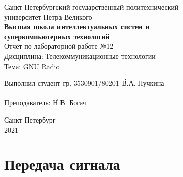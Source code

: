 \documentclass[a4paper, 14pt]{extarticle}
\begin{document}
    \begin{center}
        \begin{center}
            \hfill \break
            \normalsize{Санкт-Петербургский государственный политехнический}\\
            \normalsize{университет Петра Великого}\\
            \hfill \break
            \normalsize{\textbf{Высшая школа интеллектуальных систем и}}\\
            \normalsize{\textbf{суперкомпьютерных технологий}}\\
            \hfill \break
            \hfill \break
            \hfill \break
            \hfill \break
            \hfill \break
            \normalsize{Отчёт по лабораторной работе №12}\\
            \normalsize{Дисциплина: Телекоммуникационные технологии}\\
            \normalsize{Тема: GNU Radio}\\
        \end{center}
        \hfill \break
        \hfill \break
        \hfill \break
        \hfill \break
        \hfill \break
        \hfill \break
        \hfill \break
        \hfill \break
        \hfill \break
        \hfill \break
        \begin{tabbing}
            Выполнил студент гр. 3530901/80201 \`В.А. Пучкина\\
            \\
            Преподаватель: \`Н.В. Богач\\
        \end{tabbing}
        \hfill \break
        \hfill \break
        \hfill \break
        \hfill \break
        \begin{center}
            Санкт-Петербург\\
            2021
        \end{center}
        \thispagestyle{empty}
    \end{center}

    \newpage
    \tableofcontents

    \newpage
    \listoffigures

    \newpage
    \section{Передача сигнала}
    \label{sec:task1}
\end{document}
